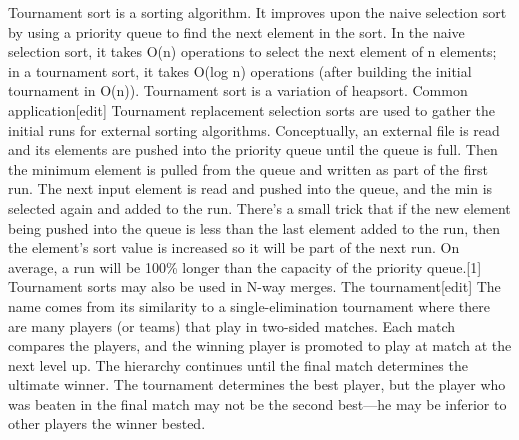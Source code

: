 Tournament sort is a sorting algorithm. It improves upon the naive selection sort by using a priority queue to find the next element in the sort. In the naive selection sort, it takes O(n) operations to select the next element of n elements; in a tournament sort, it takes O(log n) operations (after building the initial tournament in O(n)). Tournament sort is a variation of heapsort.
Common application[edit]
Tournament replacement selection sorts are used to gather the initial runs for external sorting algorithms. Conceptually, an external file is read and its elements are pushed into the priority queue until the queue is full. Then the minimum element is pulled from the queue and written as part of the first run. The next input element is read and pushed into the queue, and the min is selected again and added to the run. There's a small trick that if the new element being pushed into the queue is less than the last element added to the run, then the element's sort value is increased so it will be part of the next run. On average, a run will be 100\% longer than the capacity of the priority queue.[1]
Tournament sorts may also be used in N-way merges.
The tournament[edit]
The name comes from its similarity to a single-elimination tournament where there are many players (or teams) that play in two-sided matches. Each match compares the players, and the winning player is promoted to play at match at the next level up. The hierarchy continues until the final match determines the ultimate winner. The tournament determines the best player, but the player who was beaten in the final match may not be the second best—he may be inferior to other players the winner bested.